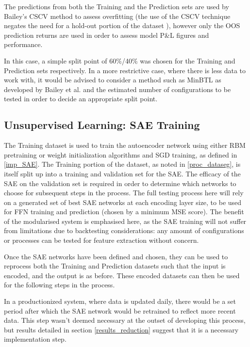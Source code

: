 \documentclass[a4paper,11pt,oneside]{article}
\theoremstyle{plain}
\theoremstyle{definition}
\begin{document}
	The predictions from both the Training and the Prediction sets are used by Bailey's CSCV method to assess overfitting (the use of the CSCV technique negates the need for a hold-out portion of the dataset \cite{BailyPBO}), however only the OOS prediction returns are used in order to assess model P\&L figures and performance. \newline
	
	In this case, a simple split point of 60\%/40\% was chosen for the Training and Prediction sets respectively. In a more restrictive case, where there is less data to work with, it would be advised to consider a method such as MinBTL as developed by Bailey et al. \cite{BaileyBTL} and the estimated number of configurations to be tested in order to decide an appropriate split point.
	
	\subsection{Unsupervised Learning: SAE Training}\label{proc_sae}
	
	The Training dataset is used to train the autoencoder network using either RBM pretraining or weight initialization algorithms and SGD training, as defined in \ref{imp_SAE}. The Training portion of the dataset, as noted in \ref{proc_dataseg}, is itself split up into a training and validation set for the SAE. The efficacy of the SAE on the validation set is required in order to determine which networks to choose for subsequent steps in the process. The full testing process here will rely on a generated set of best SAE networks at each encoding layer size, to be used for FFN training and prediction (chosen by a minimum MSE score). The benefit of the modularised system is emphasised here, as the SAE training will not suffer from limitations due to backtesting considerations: any amount of configurations or processes can be tested for feature extraction without concern. \newline
	
	Once the SAE networks have been defined and chosen, they can be used to reprocess both the Training and Prediction datasets such that the input is encoded, and the output is as before. These encoded datasets can then be used for the following steps in the process. \newline
	
	In a productionized system, where data is updated daily, there would be a set period after which the SAE network would be retrained to reflect more recent data. This step wasn't deemed necessary at the outset of developing this process, but results detailed in section \ref{results_reduction} suggest that it is a necessary implementation step.\newline
	
\end{document}
